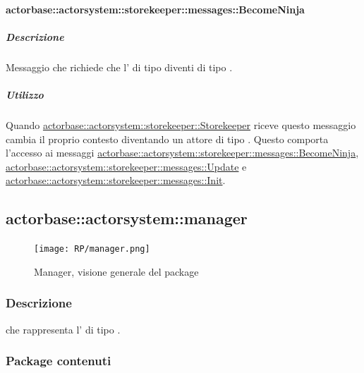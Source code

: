 \documentclass{scalatekids-article}
\begin{document}
\paragraph{actorbase::actorsystem::storekeeper::messages::BecomeNinja}
\label{sec:actorbase::actorsystem::storekeeper::messages::BecomeNinja}

\subparagraph{Descrizione}
Messaggio che richiede che l' di tipo  diventi di tipo
.

\subparagraph{Utilizzo}
Quando \hyperref[sec:actorbase::actorsystem::storekeeper::Storekeeper]{actorbase::actorsystem::storekeeper::Storekeeper}
riceve questo messaggio cambia il proprio contesto diventando un attore di tipo . Questo comporta l'accesso ai messaggi
\hyperref[sec:actorbase::actorsystem::storekeeper::messages::BecomeNinja]{actorbase::\allowbreak{}actorsystem::\allowbreak{}storekeeper::\allowbreak{}messages::\allowbreak{}BecomeNinja},
\hyperref[sec:actorbase::actorsystem::storekeeper::messages::Update]{actorbase::\allowbreak{}actorsystem::\allowbreak{}storekeeper::\allowbreak{}messages::\allowbreak{}Update} e
\hyperref[sec:actorbase::actorsystem::storekeeper::messages::Init]{actorbase::\allowbreak{}actorsystem::\allowbreak{}storekeeper::\allowbreak{}messages::\allowbreak{}Init}.



\subsection{actorbase::actorsystem::manager}
\label{sec:actorbase::actorsystem::manager}

\begin{figure}[H]
  \begin{center}
    \texttt{[image: RP/manager.png]}
    \caption{Manager, visione generale del package}
  \end{center}
\end{figure}

\subsubsection{Descrizione}
 che rappresenta l' di tipo .

\subsubsection{Package contenuti}
\end{document}
